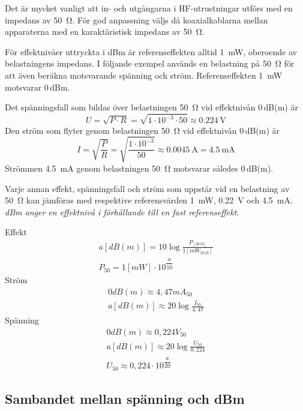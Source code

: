 Det är mycket vanligt att in- och utgångarna i HF-utrustningar utförs
med en impedans av \qty{50}{\ohm}.
För god anpassning väljs då koaxialkablarna mellan apparaterna med en
karaktäristisk impedans av \qty{50}{\ohm}.

För effektnivåer uttryckta i dBm är referenseffekten alltid
\qty{1}{\milli\watt}, oberoende av belastningens impedans.
I följande exempel används en belastning på \qty{50}{\ohm} för att även
beräkna motsvarande spänning och ström.
Referenseffekten \qty{1}{\milli\watt} motsvarar 0\,dBm.

Det spänningsfall som bildas över belastningen \qty{50}{\ohm} vid effektnivån
0\,dB(m) är
\[U = \sqrt{P\cdot R} = \sqrt{1\cdot 10^{-3} \cdot 50} \approx \qty{0,224}{\volt}\]
Den ström som flyter genom belastningen \qty{50}{\ohm} vid effektnivån 0\,dB(m)
är
\[
I = \sqrt{\frac{P}{R}} = \sqrt{\frac{1\cdot 10^{-3}}{50}} \approx \qty{0,0045}{\ampere} = \qty{4,5}{\milli\ampere}
\]
Strömmen \qty{4,5}{\milli\ampere} genom belastningen \qty{50}{\ohm} motsvarar
således 0\,dB(m).

Varje annan effekt, spänningsfall och ström som uppstår vid en belastning av
\qty{50}{\ohm} kan jämföras med respektive referensvärden \qty{1}{\milli\watt},
\qty{0,22}{\volt} och \qty{4,5}{\milli\ampere}.
\emph{dBm anger en effektnivå i förhållande till en fast referenseffekt.}

\vspace*{1ex}
\noindent
Effekt
\begin{gather*}
	a [dB(m)] = 10 \log\frac{P_{[\qty{50}{\ohm}]}}{1[mW_{\qty{50}{\ohm}}]} \\
	P_{50} = 1 [mW] \cdot 10^{\dfrac{a}{10}}
\end{gather*}
Ström
\begin{gather*}
	0 dB(m) \approx 4,47 mA_{50} \\
	a [dB(m)] \approx 20 \log\frac{I_{50}}{4,47}
\end{gather*}
Spänning
\begin{gather*}
	0 dB(m) \approx 0,224 V_{50} \\
	a [dB(m)] \approx 20 \log\frac{U_{50}}{0,224} \\
	U_{50} \approx 0,224 \cdot 10^{\dfrac{a}{20}}
\end{gather*}

\subsection[Sambandet spänning och dBm]{Sambandet mellan spänning och dBm}


